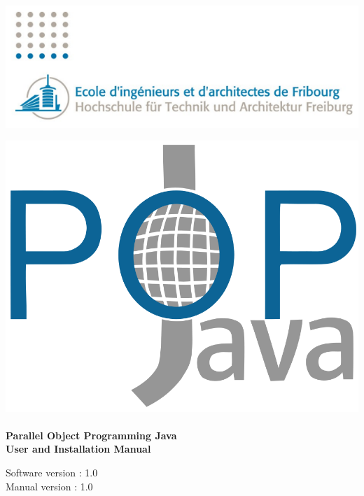
\begin{titlepage}
 
\begin{center}
\includegraphics[scale=0.5]{eif_logo.png}

\includegraphics[scale=0.2]{popjava_official.png}\\[1.5cm]


\HRule \\[1cm]
{ \huge \bfseries Parallel Object Programming Java\\[0.3cm]
User and Installation Manual}\\[0.5cm]
 \begin{center}
 Software version : 1.0\\
 Manual version : 1.0
 \end{center}
\HRule \\[2cm]
 

\end{center}
\end{titlepage}
